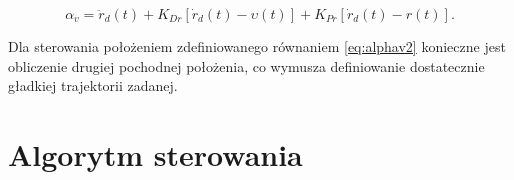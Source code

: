 \documentclass[printmode]{mgr}
\begin{document}
\begin{equation}
\alpha_v = \ddot{r}_d(t) + K_{Dr}[\dot{r}_d(t) - \upsilon(t)] + 
K_{Pr}[\dot{r}_d(t) - r(t)].
\label{eq:alphav2}
\end{equation}

Dla sterowania położeniem zdefiniowanego równaniem \eqref{eq:alphav2} konieczne jest obliczenie drugiej pochodnej położenia,
co wymusza definiowanie dostatecznie gładkiej trajektorii zadanej.

\section{Algorytm sterowania}




\appendix
\end{document}
